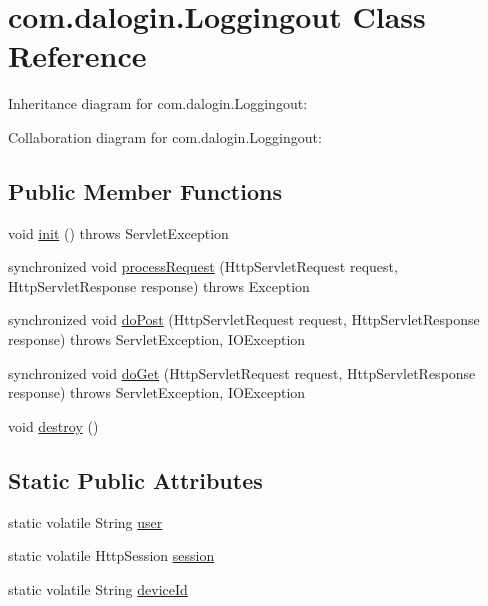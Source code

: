 \hypertarget{classcom_1_1dalogin_1_1_loggingout}{}\section{com.\+dalogin.\+Loggingout Class Reference}
\label{classcom_1_1dalogin_1_1_loggingout}


Inheritance diagram for com.\+dalogin.\+Loggingout\+:


Collaboration diagram for com.\+dalogin.\+Loggingout\+:
\subsection*{Public Member Functions}
\begin{DoxyCompactItemize}
\item 
void \hyperlink{classcom_1_1dalogin_1_1_loggingout_a6d5de76157cc1cd86ce4584be1770ea0}{init} ()  throws Servlet\+Exception 	  
\item 
synchronized void \hyperlink{classcom_1_1dalogin_1_1_loggingout_a8a2b3425799aff2fe737844345bc48da}{process\+Request} (Http\+Servlet\+Request request, Http\+Servlet\+Response response)  throws Exception 
\item 
synchronized void \hyperlink{classcom_1_1dalogin_1_1_loggingout_a6136baa87bf33f3405f1560b8261e85b}{do\+Post} (Http\+Servlet\+Request request, Http\+Servlet\+Response response)  throws Servlet\+Exception, I\+O\+Exception 	  
\item 
synchronized void \hyperlink{classcom_1_1dalogin_1_1_loggingout_a53a1ba0e21d298c5d1cc4a0bbed4d575}{do\+Get} (Http\+Servlet\+Request request, Http\+Servlet\+Response response)  throws Servlet\+Exception, I\+O\+Exception 	  
\item 
void \hyperlink{classcom_1_1dalogin_1_1_loggingout_a4d14146520d207a39b32b09ca6f346ee}{destroy} ()
\end{DoxyCompactItemize}
\subsection*{Static Public Attributes}
\begin{DoxyCompactItemize}
\item 
static volatile String \hyperlink{classcom_1_1dalogin_1_1_loggingout_abf244ba3efc4816ad0427112009b631a}{user}
\item 
static volatile Http\+Session \hyperlink{classcom_1_1dalogin_1_1_loggingout_a819b6765610e89eddfc440731da97c5b}{session}
\item 
static volatile String \hyperlink{classcom_1_1dalogin_1_1_loggingout_a976c5dd63eeb11a8614887dccb1ca982}{device\+Id}
\end{DoxyCompactItemize}


